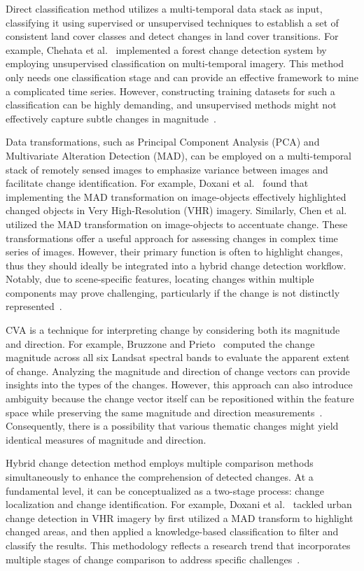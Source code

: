 \documentclass[journal]{IEEEtran}
\begin{document}
Direct classification method utilizes a multi-temporal data stack as input, classifying it using supervised or unsupervised techniques to establish a set of consistent land cover classes and detect changes in land cover transitions. For example, Chehata et al.~\cite{dc1} implemented a forest change detection system by employing unsupervised classification on multi-temporal imagery. This method only needs one classification stage and can provide an effective framework to mine a complicated time series. However, constructing training datasets for such a classification can be highly demanding, and unsupervised methods might not effectively capture subtle changes in magnitude~\cite{dc2}.

Data transformations, such as Principal Component Analysis (PCA) and Multivariate Alteration Detection (MAD), can be employed on a multi-temporal stack of remotely sensed images to emphasize variance between images and facilitate change identification. For example,  Doxani et al.~\cite{t1} found that implementing the MAD transformation on image-objects effectively highlighted changed objects in Very High-Resolution (VHR) imagery. Similarly, Chen et al.~\cite{t2} utilized the MAD transformation on image-objects to accentuate change. These transformations offer a useful approach for assessing changes in complex time series of images. However, their primary function is often to highlight changes, thus they should ideally be integrated into a hybrid change detection workflow. Notably, due to scene-specific features, locating changes within multiple components may prove challenging, particularly if the change is not distinctly represented~\cite{tcd}.

CVA is a technique for interpreting change by considering both its magnitude and direction. For example, Bruzzone and
Prieto~\cite{cva1} computed the change magnitude across all six Landsat spectral bands to evaluate the apparent extent of change. Analyzing the magnitude and direction of change vectors can provide insights into the types of the changes. However, this approach can also introduce ambiguity because the change vector itself can be repositioned within the feature space while preserving the same magnitude and direction measurements~\cite{cva2}. Consequently, there is a possibility that various thematic changes might yield identical measures of magnitude and direction.

Hybrid change detection method employs multiple comparison methods simultaneously to enhance the comprehension of detected changes. At a fundamental level, it can be conceptualized as a two-stage process: change localization and change identification. For example, Doxani et al.~\cite{t1} tackled urban change detection in VHR imagery by first utilized a MAD transform to highlight changed areas, and then applied a knowledge-based classification to filter and classify the results. This methodology reflects a research trend that incorporates multiple stages of change comparison to address specific challenges~\cite{tcd}.
\end{document}
